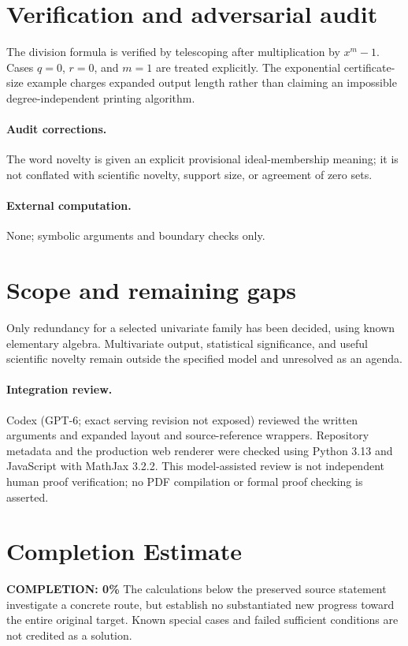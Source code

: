 \documentclass[11pt]{article}
\begin{document}
\section{Verification and adversarial audit}
The division formula is verified by telescoping after multiplication by $x^m-1$. Cases $q=0$, $r=0$, and $m=1$ are treated explicitly. The exponential certificate-size example charges expanded output length rather than claiming an impossible degree-independent printing algorithm.
\paragraph{Audit corrections.} The word novelty is given an explicit provisional ideal-membership meaning; it is not conflated with scientific novelty, support size, or agreement of zero sets.
\paragraph{External computation.} None; symbolic arguments and boundary checks only.
\section{Scope and remaining gaps}
Only redundancy for a selected univariate family has been decided, using known elementary algebra. Multivariate output, statistical significance, and useful scientific novelty remain outside the specified model and unresolved as an agenda.
\paragraph{Integration review.} Codex (GPT-6; exact serving revision not exposed) reviewed the written arguments and expanded layout and source-reference wrappers. Repository metadata and the production web renderer were checked using Python 3.13 and JavaScript with MathJax 3.2.2. This model-assisted review is not independent human proof verification; no PDF compilation or formal proof checking is asserted.

\section{Completion Estimate}
\noindent\textbf{COMPLETION: 0\%}
The calculations below the preserved source statement investigate a concrete route,
but establish no substantiated new progress toward the entire original target.
Known special cases and failed sufficient conditions are not credited as a solution.
\end{document}
